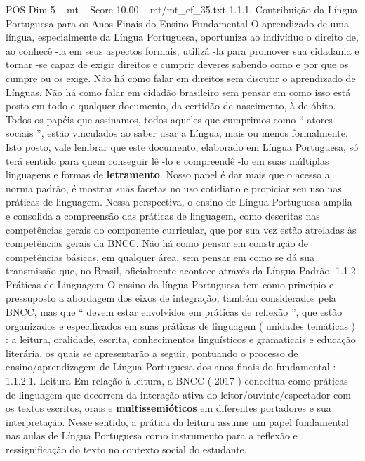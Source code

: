 \begin{textsample}{POS Dim 5 – mt – Score 10.00 – mt/mt\_ef\_35.txt}  \label{ex:f5_pos_082}
1.1.1.
Contribuição da Língua Portuguesa para os Anos Finais do Ensino Fundamental O aprendizado de uma língua, especialmente da Língua Portuguesa, oportuniza ao indivíduo o direito de, ao conhecê -la em seus aspectos formais, utilizá -la para promover sua cidadania e tornar -se capaz de exigir direitos e cumprir deveres sabendo como e por que os cumpre ou os exige.
Não há como falar em direitos sem discutir o aprendizado de Línguas.
Não há como falar em cidadão brasileiro sem pensar em como isso está posto em todo e qualquer documento, da certidão de nascimento, à de óbito.
Todos os papéis que assinamos, todos aqueles que cumprimos como “ atores sociais ”, estão vinculados ao saber usar a Língua, mais ou menos formalmente.
Isto posto, vale lembrar que este documento, elaborado em Língua Portuguesa, só terá sentido para quem conseguir lê -lo e compreendê -lo em suas múltiplas linguagens e formas de \textbf{letramento}.
Nosso papel é dar mais que o acesso a norma padrão, é mostrar suas facetas no uso cotidiano e propiciar seu uso nas práticas de linguagem.
Nessa perspectiva, o ensino de Língua Portuguesa amplia e consolida a compreensão das práticas de linguagem, como descritas nas competências gerais do componente curricular, que por sua vez estão atreladas às competências gerais da BNCC.
Não há como pensar em construção de competências básicas, em qualquer área, sem pensar em como se dá sua transmissão que, no Brasil, oficialmente acontece através da Língua Padrão. 1.1.2.
Práticas de Linguagem O ensino da língua Portuguesa tem como princípio e pressuposto a abordagem dos eixos de integração, também considerados pela BNCC, mas que “ devem estar envolvidos em práticas de reflexão ”, que estão organizados e especificados em suas práticas de linguagem ( unidades temáticas ) : a leitura, oralidade, escrita, conhecimentos linguísticos e gramaticais e educação literária, os quais se apresentarão a seguir, pontuando o processo de ensino/aprendizagem de Língua Portuguesa dos anos finais do fundamental : 1.1.2.1.
Leitura Em relação à leitura, a BNCC ( 2017 ) conceitua como práticas de linguagem que decorrem da interação ativa do leitor/ouvinte/espectador com os textos escritos, orais e \textbf{multissemióticos} em diferentes portadores e sua interpretação.
Nesse sentido, a prática da leitura assume um papel fundamental nas aulas de Língua Portuguesa como instrumento para a reflexão e ressignificação do texto no contexto social do estudante.

\end{textsample}

